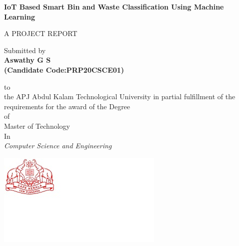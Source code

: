 

\begin{titlepage}
	\begin{center}
		\vspace{0.35cm}
		\vspace{0.5cm}
		\textbf{\Large{IoT Based Smart Bin and Waste Classification Using Machine Learning}}\\ \vspace{0.9cm}
	
		\normalsize
		
     	\vspace{2cm}
     	A PROJECT REPORT 
		
		Submitted by\\
		\vspace{1cm}
		\textbf{{\selectfont Aswathy G S}}\\
		\textbf{{\selectfont(Candidate Code:PRP20CSCE01)}}\\
		\vspace{1cm}
	        
	         to\\
	         \vspace{1cm}
	         \normalsize
	         \vspace{0.1cm}
	         the APJ Abdul Kalam Technological University in partial fulfillment of the requirements for the award of  the Degree \\
	         \vspace{0.5cm}
	         of\\
	         \vspace{1cm}
	         Master of Technology\\
	            In\\
	            \textit{ Computer Science and Engineering}\\
	\vspace{1cm}
	
		\begin{center}
	\hspace{5cm}
	    	\includegraphics[]{am2.jpg}
	\end{center}
		\normalsize
		

\end{center}
\end{titlepage}
